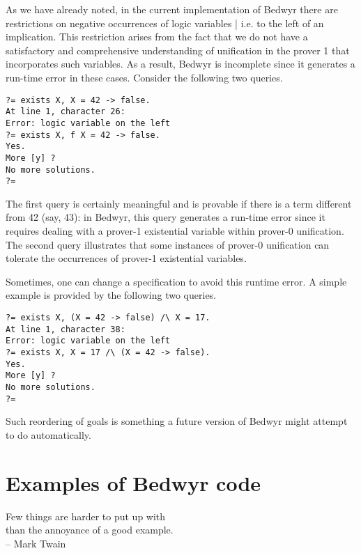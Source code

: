 \documentclass{article}
\begin{document}
As we have already noted, in the current implementation of Bedwyr
there are restrictions on negative occurrences of logic variables |
i.e. to the left of an implication.
This restriction arises from the fact that we do not
have a satisfactory and comprehensive understanding of unification in
the prover 1 that incorporates such variables.  As a result, Bedwyr
is incomplete since it generates a run-time error in these cases.
Consider the following two queries.
\begin{verbatim}
?= exists X, X = 42 -> false.
At line 1, character 26:
Error: logic variable on the left
?= exists X, f X = 42 -> false.
Yes.
More [y] ?
No more solutions.
?=
\end{verbatim}
The first query is certainly meaningful and is provable if there is a
term different from 42 (say, 43): in Bedwyr, this query generates a
run-time error since it requires dealing with a prover-1
existential variable within prover-0 unification. The second query illustrates
that some instances of prover-0 unification can tolerate the
occurrences of prover-1 existential variables.

Sometimes, one can change a specification to avoid this runtime
error.  A simple example is provided by the following two queries.
\begin{verbatim}
?= exists X, (X = 42 -> false) /\ X = 17.
At line 1, character 38:
Error: logic variable on the left
?= exists X, X = 17 /\ (X = 42 -> false).
Yes.
More [y] ?
No more solutions.
?=
\end{verbatim}
Such reordering of goals is something a future version of Bedwyr might
attempt to do automatically.




\section{Examples of Bedwyr code}

\begin{flushright}
Few things are harder to put up with \\
than the annoyance of a good example. \\ -- Mark Twain
\end{flushright}
\end{document}
